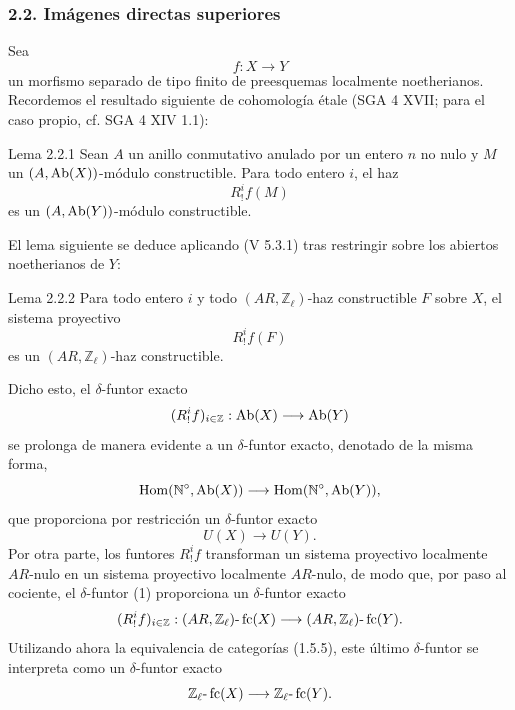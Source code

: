 \subsubsection*{2.2. Imágenes directas superiores}

Sea
\[
f:X\longrightarrow Y
\]
un morfismo separado de tipo finito de preesquemas localmente noetherianos. Recordemos el resultado siguiente de cohomología étale (SGA 4 XVII; para el caso propio, cf. SGA 4 XIV 1.1):

\begin{statement}{Lema 2.2.1}
Sean \(A\) un anillo conmutativo anulado por un entero \(n\) no nulo y \(M\) un \((A,\operatorname{Ab}(X))\)-módulo constructible. Para todo entero \(i\), el haz
\[
R^i_!f(M)
\]
es un \((A,\operatorname{Ab}(Y))\)-módulo constructible.
\end{statement}

El lema siguiente se deduce aplicando (V 5.3.1) tras restringir sobre los abiertos noetherianos de \(Y\):

\begin{statement}{Lema 2.2.2}
Para todo entero \(i\) y todo \((AR,\mathbb Z_\ell)\)-haz constructible \(F\) sobre \(X\), el sistema proyectivo
\[
R^i_!f(F)
\]
es un \((AR,\mathbb Z_\ell)\)-haz constructible.
\end{statement}

Dicho esto, el \(\delta\)-funtor exacto
\[
(R^i_!f)_{i\in\mathbb Z}:\operatorname{Ab}(X)\longrightarrow \operatorname{Ab}(Y)
\]
se prolonga de manera evidente a un \(\delta\)-funtor exacto, denotado de la misma forma,
\[
\operatorname{Hom}(\mathbb N^\circ,\operatorname{Ab}(X))\longrightarrow \operatorname{Hom}(\mathbb N^\circ,\operatorname{Ab}(Y)),
\]
que proporciona por restricción un \(\delta\)-funtor exacto
\[
U(X)\longrightarrow U(Y).
\tag{1}
\]
Por otra parte, los funtores \(R^i_!f\) transforman un sistema proyectivo localmente \(AR\)-nulo en un sistema proyectivo localmente \(AR\)-nulo, de modo que, por paso al cociente, el \(\delta\)-funtor (1) proporciona un \(\delta\)-funtor exacto%
\[
(R^i_!f)_{i\in\mathbb Z}:(AR,\mathbb Z_\ell)\text{-}\operatorname{fc}(X)
\longrightarrow (AR,\mathbb Z_\ell)\text{-}\operatorname{fc}(Y).
\]
Utilizando ahora la equivalencia de categorías (1.5.5), este último \(\delta\)-funtor se interpreta como un \(\delta\)-funtor exacto
\[
\mathbb Z_\ell\text{-}\operatorname{fc}(X)\longrightarrow \mathbb Z_\ell\text{-}\operatorname{fc}(Y).
\]

